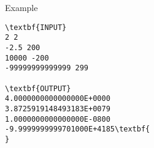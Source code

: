 Example
\begin{verbatim}
\textbf{INPUT}
2 2
-2.5 200
10000 -200
-99999999999999 299

\textbf{OUTPUT}
4.0000000000000000E+0000
3.8725919148493183E+0079
1.0000000000000000E-0800
-9.9999999999701000E+4185\textbf{        
}\end{verbatim}